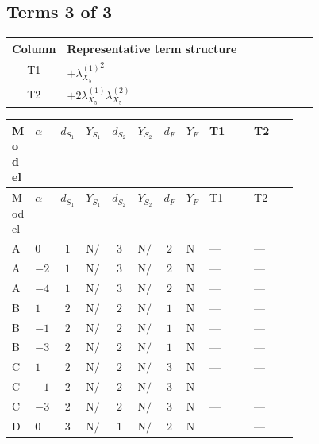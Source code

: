 \documentclass[8pt]{article}
\begin{document}
\begin{landscape}
\subsection*{Terms 3 of 3}
\begin{center}
\begin{tabular}{@{}c >{\raggedright\arraybackslash}p{0.82\linewidth}@{}}
\toprule
Column & Representative term structure \\
\midrule
T1 & \(\displaystyle +{\lambda_{X_{5}}^{(1)}}^2\) \\
\midrule
T2 & \(\displaystyle +2 {\lambda_{X_{5}}^{(1)}} {\lambda_{X_{5}}^{(2)}}\) \\
\midrule
\bottomrule
\end{tabular}
\end{center}
\smallskip
\tiny
\begin{longtable}{@{}llcccccc >{\raggedright\arraybackslash}p{0.21\linewidth} >{\raggedright\arraybackslash}p{0.21\linewidth}@{}}
\toprule
Model & $\alpha$ & $d_{S_1}$ & $Y_{S_1}$ & $d_{S_2}$ & $Y_{S_2}$ & $d_F$ & $Y_F$ & T1 & T2 \\
\midrule
\endfirsthead
\toprule
Model & $\alpha$ & $d_{S_1}$ & $Y_{S_1}$ & $d_{S_2}$ & $Y_{S_2}$ & $d_F$ & $Y_F$ & T1 & T2 \\
\midrule
\endhead
A & $0$ & $1$ & $\text{N/A}$ & $3$ & $\text{N/A}$ & $2$ & $\text{N/A}$ & --- & --- \\
\midrule
A & $-2$ & $1$ & $\text{N/A}$ & $3$ & $\text{N/A}$ & $2$ & $\text{N/A}$ & --- & --- \\
\midrule
A & $-4$ & $1$ & $\text{N/A}$ & $3$ & $\text{N/A}$ & $2$ & $\text{N/A}$ & --- & --- \\
\midrule
B & $1$ & $2$ & $\text{N/A}$ & $2$ & $\text{N/A}$ & $1$ & $\text{N/A}$ & --- & --- \\
\midrule
B & $-1$ & $2$ & $\text{N/A}$ & $2$ & $\text{N/A}$ & $1$ & $\text{N/A}$ & --- & --- \\
\midrule
B & $-3$ & $2$ & $\text{N/A}$ & $2$ & $\text{N/A}$ & $1$ & $\text{N/A}$ & --- & --- \\
\midrule
C & $1$ & $2$ & $\text{N/A}$ & $2$ & $\text{N/A}$ & $3$ & $\text{N/A}$ & --- & --- \\
\midrule
C & $-1$ & $2$ & $\text{N/A}$ & $2$ & $\text{N/A}$ & $3$ & $\text{N/A}$ & --- & --- \\
\midrule
C & $-3$ & $2$ & $\text{N/A}$ & $2$ & $\text{N/A}$ & $3$ & $\text{N/A}$ & --- & --- \\
\midrule
D & $0$ & $3$ & $\text{N/A}$ & $1$ & $\text{N/A}$ & $2$ & $\text{N/A}$ & \scriptsize\adjustbox{max width=\linewidth}{$\begin{gathered} +{\lambda_{X_{5}}^{(1)}}^2\end{gathered}$} & --- \\

\end{longtable}
\end{landscape}
\end{document}

